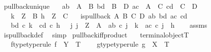 \begin{isabellebody}
\isanewline
{}\isamarkupfalse%
\ pullback{\isacharunderscore}{\kern0pt}unique{\isacharcolon}{\kern0pt}\isanewline
\ \ \ {\isachardoublequoteopen}ab\ {\isacharcolon}{\kern0pt}\ A\ {\isasymrightarrow}\ B{\isachardoublequoteclose}\ {\isachardoublequoteopen}bd\ {\isacharcolon}{\kern0pt}\ B\ {\isasymrightarrow}\ D{\isachardoublequoteclose}\ {\isachardoublequoteopen}ac\ {\isacharcolon}{\kern0pt}\ A\ {\isasymrightarrow}\ C{\isachardoublequoteclose}\ {\isachardoublequoteopen}cd\ {\isacharcolon}{\kern0pt}\ C\ {\isasymrightarrow}\ D{\isachardoublequoteclose}\isanewline
\ \ \ {\isachardoublequoteopen}k\ {\isacharcolon}{\kern0pt}\ Z\ {\isasymrightarrow}\ B{\isachardoublequoteclose}\ {\isachardoublequoteopen}h\ {\isacharcolon}{\kern0pt}\ Z\ {\isasymrightarrow}\ C{\isachardoublequoteclose}\isanewline
\ \ \ {\isachardoublequoteopen}is{\isacharunderscore}{\kern0pt}pullback\ A\ B\ C\ D\ ab\ bd\ ac\ cd{\isachardoublequoteclose}\isanewline
\ \ \ {\isachardoublequoteopen}bd\ {\isasymcirc}\isactrlsub c\ k\ {\isacharequal}{\kern0pt}\ cd\ {\isasymcirc}\isactrlsub c\ h\ {\isasymLongrightarrow}\ {\isacharparenleft}{\kern0pt}{\isasymexists}{\isacharbang}{\kern0pt}\ j{\isachardot}{\kern0pt}\ j\ {\isacharcolon}{\kern0pt}\ Z\ {\isasymrightarrow}\ A\ {\isasymand}\ ab\ {\isasymcirc}\isactrlsub c\ j\ {\isacharequal}{\kern0pt}\ k\ {\isasymand}\ ac\ {\isasymcirc}\isactrlsub c\ j\ {\isacharequal}{\kern0pt}\ h{\isacharparenright}{\kern0pt}{\isachardoublequoteclose}\isanewline
%
\isadelimproof
\ \ %
\endisadelimproof
%
\isatagproof
{}\isamarkupfalse%
\ assms\ \isamarkupfalse%
\ is{\isacharunderscore}{\kern0pt}pullback{\isacharunderscore}{\kern0pt}def\ \isamarkupfalse%
\ simp%
\endisatagproof
{\isafoldproof}%
%
\isadelimproof
\isanewline
%
\endisadelimproof
\isanewline
{}\isamarkupfalse%
\ pullback{\isacharunderscore}{\kern0pt}iff{\isacharunderscore}{\kern0pt}product{\isacharcolon}{\kern0pt}\isanewline
\ \ \ {\isachardoublequoteopen}terminal{\isacharunderscore}{\kern0pt}object{\isacharparenleft}{\kern0pt}T{\isacharparenright}{\kern0pt}{\isachardoublequoteclose}\isanewline
\ \ \ f{\isacharunderscore}{\kern0pt}type{\isacharbrackleft}{\kern0pt}type{\isacharunderscore}{\kern0pt}rule{\isacharbrackright}{\kern0pt}{\isacharcolon}{\kern0pt}\ {\isachardoublequoteopen}f\ {\isacharcolon}{\kern0pt}\ Y\ {\isasymrightarrow}\ T{\isachardoublequoteclose}\ \isanewline
\ \ \ g{\isacharunderscore}{\kern0pt}type{\isacharbrackleft}{\kern0pt}type{\isacharunderscore}{\kern0pt}rule{\isacharbrackright}{\kern0pt}{\isacharcolon}{\kern0pt}\ {\isachardoublequoteopen}g\ {\isacharcolon}{\kern0pt}\ X\ {\isasymrightarrow}\ T{\isachardoublequoteclose}\isanewline

\end{isabellebody}
